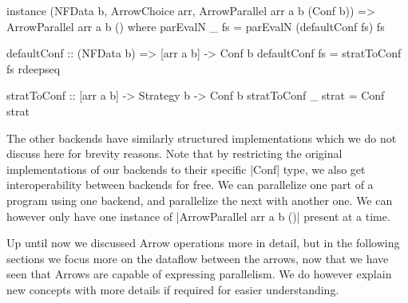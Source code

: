 \begin{code}
instance (NFData b, ArrowChoice arr, ArrowParallel arr a b (Conf b)) =>
  ArrowParallel arr a b () where
    parEvalN _ fs = parEvalN (defaultConf fs) fs

defaultConf :: (NFData b) => [arr a b] -> Conf b
defaultConf fs = stratToConf fs rdeepseq

stratToConf :: [arr a b] -> Strategy b -> Conf b
stratToConf _ strat = Conf strat
\end{code}

The other backends have similarly structured implementations which we do not discuss here for brevity reasons. Note that by restricting the original implementations of our backends to their specific |Conf| type, we also get interoperability between backends for free. We can parallelize one part of a program using one backend, and parallelize the next with another one. We can however only have one instance of |ArrowParallel arr a b ()| present at a time.

Up until now we discussed Arrow operations more in detail, but in the following sections we focus more on the dataflow between the arrows, now that we have seen that Arrows are capable of expressing parallelism. We do however explain new concepts with more details if required for easier understanding.